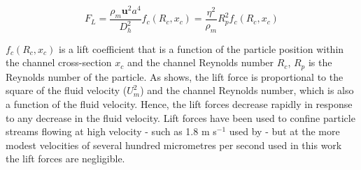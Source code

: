 \begin{equation}
F_{L}= \frac{\rho_{m} \textbf{u}^{2} a^{4}}{D_{h}^{2}} f_{c}(R_{c},x_{c}) = \frac{\eta^{2}}{\rho_{m}} R_{p}^{2} f_{c}(R_{c},x_{c})
 \label{eqn:lift_force}
\end{equation}

$f_{c}(R_{c},x_{c})$ is a lift coefficient that is a function of the particle position within the channel cross-section $x_{c}$ and the channel Reynolds number $R_{c}$, $R_{p}$ is the Reynolds number of the particle. As  shows, the lift force is proportional to the square of the fluid velocity ($U_{m}^{2}$) and the channel Reynolds number, which is also a function of the fluid velocity. Hence, the lift forces decrease rapidly in response to any decrease in the fluid velocity. Lift forces have been used to confine particle streams flowing at high velocity - such as 1.8 m s$^{-1}$ used by \cite{DiCarlo:2007} - but at the more modest velocities of several hundred micrometres per second used in this work the lift forces are negligible.